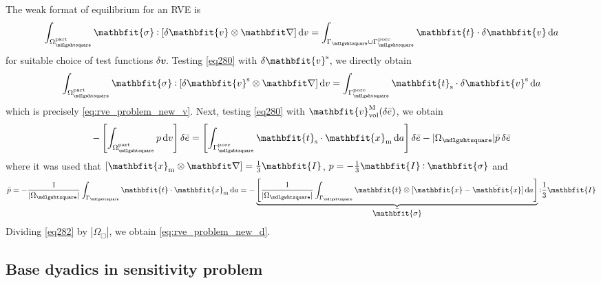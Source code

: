 \documentclass[12pt,a4paper,fleqn]{article}
\renewcommand{\ta}[1]{\mathbfit{#1}}
\renewcommand{\ts}[1]{\mathbfit{#1}}
\renewcommand{\Box}{\mdlgwhtsquare}
\newcommand{\pore}{\mathrm{pore}}
\newcommand{\particle}{\mathrm{part}}
\newcommand{\surf}{\mathrm{s}}
\begin{document}
The weak format of equilibrium for an RVE is
\begin{equation}
    \int_{\Omega^\particle_\Box} \ts{\sigma} \dprod \left[\delta \ta{v}\outerp\diff\right] \dif v =
    \int_{\Gamma_\Box\cup\Gamma_\Box^\pore} \ta{t} \cdot \delta\ta{v} \dif a
\label{eq280}
\end{equation}
for suitable choice of test functions $\delta \ta{v}$. Testing \eqref{eq280} with $\delta \ta{v}^\fluct$, we directly obtain
\begin{equation}
    \int_{\Omega^\particle_\Box} \ts{\sigma} \dprod \left[\delta \ta{v}^\fluct\outerp\diff\right] \dif v =
    \int_{\Gamma_\Box^\pore} \ta{t}_\surf \cdot \delta\ta{v}^\fluct \dif a
\label{eq281}
\end{equation}
which is precisely \eqref{eq:rve_problem_new_v}. Next, testing \eqref{eq280} with $\ta{v}^\macro_\vol(\delta\bar{e})$, we obtain
\begin{equation}
    - \left[\int_{\Omega^\particle_\Box} p  \dif v \right]\delta\bar{e} =
    \left[\int_{\Gamma_\Box^\pore} \ta{t}_\surf \cdot \ta{x}_\mean \dif a\right]\delta\bar{e}
    - |\Omega_\Box|\bar{p}\,\delta\bar{e}
\label{eq282}
\end{equation}
where it was used that $[\ta{x}_\mean\outerp\diff]=\frac{1}{3}\ts{I}$, $p=-\frac{1}{3}\ts{I}\dprod\ts{\sigma}$ and
\begin{equation}
    \bar{p} = - \frac{1}{|\Omega_\Box|} \int_{\Gamma_\Box} \ta{t} \cdot \ta{x}_\mean \dif a =
     - \underbrace{\left[\frac{1}{|\Omega_\Box|} \int_{\Gamma_\Box} \ta{t} \outerp [\ta{x}-\bar{\ta{x}}] \dif a\right]}_{\displaystyle\bar{\ts\sigma}}  \dprod \frac{1}{3}\ts{I}
\end{equation}
Dividing \eqref{eq282} by $|\Omega_\Box|$, we obtain \eqref{eq:rve_problem_new_d}.

\subsection{Base dyadics in sensitivity problem}
\end{document}
